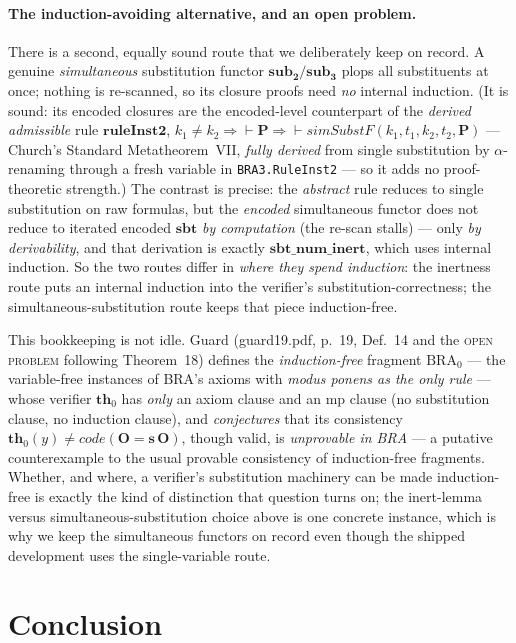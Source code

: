 \documentclass[11pt]{article}
\theoremstyle{plain}
\theoremstyle{definition}
\theoremstyle{remark}
\newcommand{\code}[1]{\mathit{code}(#1)}
\newcommand{\sbt}{\mathbf{sbt}}
\newcommand{\subtwo}{\mathbf{sub_2}}
\begin{document}
\paragraph{The induction-avoiding alternative, and an open problem.}  There
is a second, equally sound route that we deliberately keep on record.  A
genuine \emph{simultaneous} substitution functor $\subtwo/\mathbf{sub_3}$
plops all substituents at once; nothing is re-scanned, so its closure proofs
need \emph{no} internal induction.  (It is sound: its encoded closures are
the encoded-level counterpart of the \emph{derived admissible} rule
$\mathbf{ruleInst2}$, $k_1\neq k_2 \Rightarrow {\vdash}\mathbf{P} \Rightarrow
{\vdash}\mathit{simSubstF}(k_1,t_1,k_2,t_2,\mathbf{P})$ --- Church's Standard
Metatheorem~VII, \emph{fully derived} from single substitution by
$\alpha$-renaming through a fresh variable in \verb|BRA3.RuleInst2| --- so it
adds no proof-theoretic strength.)  The contrast is precise: the
\emph{abstract} rule reduces to single substitution on raw formulas, but the
\emph{encoded} simultaneous functor does not reduce to iterated encoded
$\sbt$ \emph{by computation} (the re-scan stalls) --- only \emph{by
derivability}, and that derivation is exactly $\mathbf{sbt\_num\_inert}$,
which uses internal induction.  So the two routes differ in \emph{where they
spend induction}: the inertness route puts an internal induction into the
verifier's substitution-correctness; the simultaneous-substitution route
keeps that piece induction-free.

This bookkeeping is not idle.  Guard (guard19.pdf, p.~19, Def.~14 and the
\textsc{open problem} following Theorem~18) defines the \emph{induction-free}
fragment $\mathrm{BRA}_0$ --- the variable-free instances of BRA's axioms
with \emph{modus ponens as the only rule} --- whose verifier $\mathbf{th}_0$
has \emph{only} an axiom clause and an mp clause (no substitution clause, no
induction clause), and \emph{conjectures} that its consistency
$\mathbf{th}_0(y) \neq \code{\mathbf{O}=\mathbf{s}\,\mathbf{O}}$, though
valid, is \emph{unprovable in BRA} --- a putative counterexample to the usual
provable consistency of induction-free fragments.  Whether, and where, a
verifier's substitution machinery can be made induction-free is exactly the
kind of distinction that question turns on; the inert-lemma versus
simultaneous-substitution choice above is one concrete instance, which is why
we keep the simultaneous functors on record even though the shipped
development uses the single-variable route.

\section{Conclusion}
\end{document}
